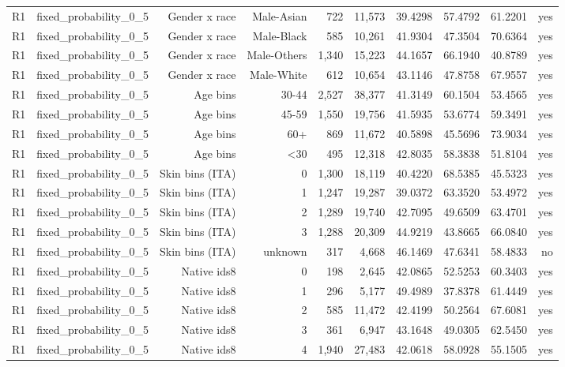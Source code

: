 \documentclass[10pt]{article}
\begin{document}
\begin{longtable}{@{}lrrrrrrrrr@{}}
R1 & fixed\_probability\_0\_5 & Gender x race & Male-Asian & 722 & 11,573 & 39.4298 & 57.4792 & 61.2201 & yes \\
R1 & fixed\_probability\_0\_5 & Gender x race & Male-Black & 585 & 10,261 & 41.9304 & 47.3504 & 70.6364 & yes \\
R1 & fixed\_probability\_0\_5 & Gender x race & Male-Others & 1,340 & 15,223 & 44.1657 & 66.1940 & 40.8789 & yes \\
R1 & fixed\_probability\_0\_5 & Gender x race & Male-White & 612 & 10,654 & 43.1146 & 47.8758 & 67.9557 & yes \\
R1 & fixed\_probability\_0\_5 & Age bins & 30-44 & 2,527 & 38,377 & 41.3149 & 60.1504 & 53.4565 & yes \\
R1 & fixed\_probability\_0\_5 & Age bins & 45-59 & 1,550 & 19,756 & 41.5935 & 53.6774 & 59.3491 & yes \\
R1 & fixed\_probability\_0\_5 & Age bins & 60+ & 869 & 11,672 & 40.5898 & 45.5696 & 73.9034 & yes \\
R1 & fixed\_probability\_0\_5 & Age bins & \textless{}30 & 495 & 12,318 & 42.8035 & 58.3838 & 51.8104 & yes \\
R1 & fixed\_probability\_0\_5 & Skin bins (ITA) & 0 & 1,300 & 18,119 & 40.4220 & 68.5385 & 45.5323 & yes \\
R1 & fixed\_probability\_0\_5 & Skin bins (ITA) & 1 & 1,247 & 19,287 & 39.0372 & 63.3520 & 53.4972 & yes \\
R1 & fixed\_probability\_0\_5 & Skin bins (ITA) & 2 & 1,289 & 19,740 & 42.7095 & 49.6509 & 63.4701 & yes \\
R1 & fixed\_probability\_0\_5 & Skin bins (ITA) & 3 & 1,288 & 20,309 & 44.9219 & 43.8665 & 66.0840 & yes \\
R1 & fixed\_probability\_0\_5 & Skin bins (ITA) & unknown & 317 & 4,668 & 46.1469 & 47.6341 & 58.4833 & no \\
R1 & fixed\_probability\_0\_5 & Native ids8 & 0 & 198 & 2,645 & 42.0865 & 52.5253 & 60.3403 & yes \\
R1 & fixed\_probability\_0\_5 & Native ids8 & 1 & 296 & 5,177 & 49.4989 & 37.8378 & 61.4449 & yes \\
R1 & fixed\_probability\_0\_5 & Native ids8 & 2 & 585 & 11,472 & 42.4199 & 50.2564 & 67.6081 & yes \\
R1 & fixed\_probability\_0\_5 & Native ids8 & 3 & 361 & 6,947 & 43.1648 & 49.0305 & 62.5450 & yes \\
R1 & fixed\_probability\_0\_5 & Native ids8 & 4 & 1,940 & 27,483 & 42.0618 & 58.0928 & 55.1505 & yes \\

\end{longtable}
\end{document}

